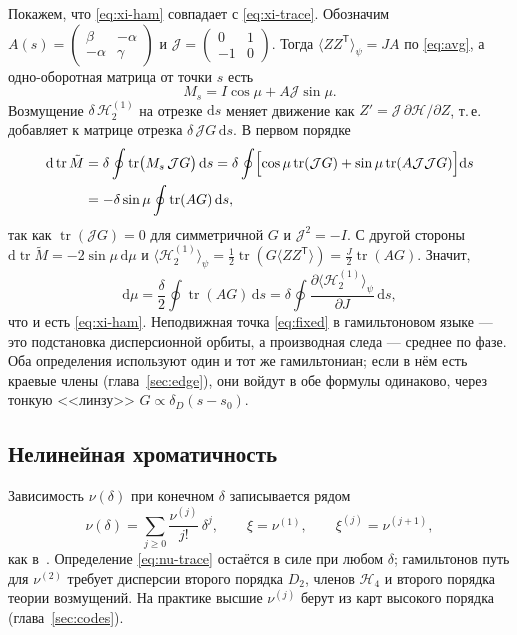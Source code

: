 Покажем, что \eqref{eq:xi-ham} совпадает с \eqref{eq:xi-trace}. Обозначим $A(s)=\begin{pmatrix}\beta&-\alpha\\-\alpha&\gamma\end{pmatrix}$ и $\mathcal{J}=\begin{pmatrix}0&1\\-1&0\end{pmatrix}$. Тогда $\langle ZZ^{\mathsf T}\rangle_\psi=JA$ по \eqref{eq:avg}, а одно-оборотная матрица от точки $s$ есть
\begin{equation}
\label{eq:Ms}
M_s=I\cos\mu+A\mathcal{J}\sin\mu.
\end{equation}
Возмущение $\delta\,\mathcal{H}_2^{(1)}$ на отрезке $\mathrm{d}s$ меняет движение как $Z'=\mathcal{J}\,\partial\mathcal{H}/\partial Z$, т.\,е. добавляет к матрице отрезка $\delta\,\mathcal{J}G\,\mathrm{d}s$. В первом порядке
\begin{equation}
\label{eq:dtr}
\begin{aligned}
\mathrm{d}\operatorname{tr}\tilde M
&=\delta\oint\operatorname{tr}\bigl(M_s\,\mathcal{J}G\bigr)\,\mathrm{d}s
=\delta\oint\Bigl[\cos\mu\operatorname{tr}(\mathcal{J}G)+\sin\mu\operatorname{tr}(A\mathcal{J}\mathcal{J}G)\Bigr]\mathrm{d}s\\
&=-\delta\sin\mu\oint\operatorname{tr}(AG)\,\mathrm{d}s,
\end{aligned}
\end{equation}
так как $\operatorname{tr}(\mathcal{J}G)=0$ для симметричной $G$ и $\mathcal{J}^2=-I$. С другой стороны $\mathrm{d}\operatorname{tr}\tilde M=-2\sin\mu\,\mathrm{d}\mu$ и $\langle\mathcal{H}_2^{(1)}\rangle_\psi=\tfrac12\operatorname{tr}(G\langle ZZ^{\mathsf T}\rangle)=\tfrac{J}{2}\operatorname{tr}(AG)$. Значит,
\begin{equation}
\label{eq:equiv}
\mathrm{d}\mu=\frac{\delta}{2}\oint\operatorname{tr}(AG)\,\mathrm{d}s
=\delta\oint\frac{\partial\langle\mathcal{H}_2^{(1)}\rangle_\psi}{\partial J}\,\mathrm{d}s,
\end{equation}
что и есть \eqref{eq:xi-ham}. Неподвижная точка \eqref{eq:fixed} в гамильтоновом языке --- это подстановка дисперсионной орбиты, а производная следа --- среднее по фазе. Оба определения используют один и тот же гамильтониан; если в нём есть краевые члены (глава~\ref{sec:edge}), они войдут в обе формулы одинаково, через тонкую <<линзу>> $G\propto\delta_D(s-s_0)$.

\subsection{Нелинейная хроматичность}

Зависимость $\nu(\delta)$ при конечном $\delta$ записывается рядом
\begin{equation}
\label{eq:nu-series}
\nu(\delta)=\sum_{j\ge0}\frac{\nu^{(j)}}{j!}\,\delta^j,
\qquad
\xi=\nu^{(1)},
\qquad
\xi^{(j)}=\nu^{(j+1)},
\end{equation}
как в~\cite{ValetovChrom2026}. Определение \eqref{eq:nu-trace} остаётся в силе при любом $\delta$; гамильтонов путь для $\nu^{(2)}$ требует дисперсии второго порядка $D_2$, членов $\mathcal{H}_4$ и второго порядка теории возмущений. На практике высшие $\nu^{(j)}$ берут из карт высокого порядка (глава~\ref{sec:codes}).
